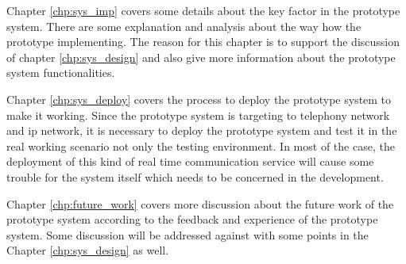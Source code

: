 \par Chapter \ref{chp:sys_imp} covers some details about the key factor in the prototype system. There are some explanation and analysis about the way how the prototype implementing. The reason for this chapter is to support the discussion of chapter \ref{chp:sys_design} and also give more information about the prototype system functionalities.

\par Chapter \ref{chp:sys_deploy} covers the process to deploy the prototype system to make it working. Since the prototype system is targeting to telephony network and \gls{ip} network, it is necessary to deploy the prototype system and test it in the real working scenario not only the testing environment. In most of the case, the deployment of this kind of real time communication service will cause some trouble for the system itself which needs to be concerned in the development.

\par Chapter \ref{chp:future_work} covers more discussion about the future work of the prototype system according to the feedback and experience of the prototype system. Some discussion will be addressed against with some points in the Chapter \ref{chp:sys_design} as well.

